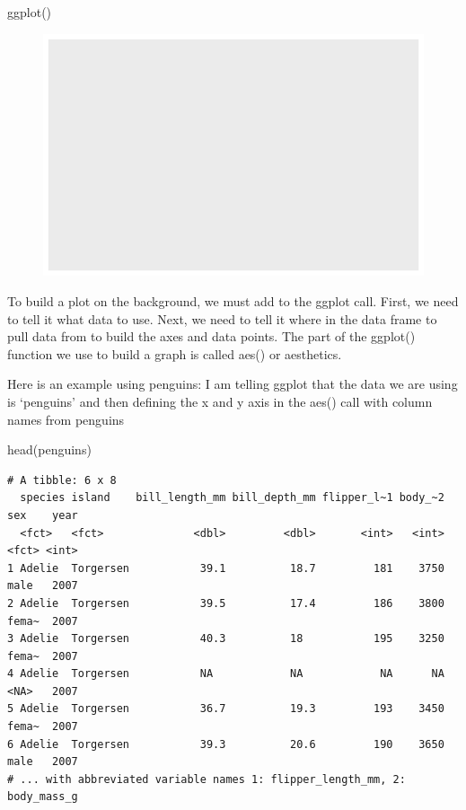 \documentclass[
  letterpaper,
  DIV=11,
  numbers=noendperiod]{scrartcl}
\newenvironment{Shaded}{\begin{snugshade}}{\end{snugshade}}
\newcommand{\FunctionTok}[1]{\textcolor[rgb]{0.28,0.35,0.67}{#1}}
\newcommand{\NormalTok}[1]{\textcolor[rgb]{0.00,0.23,0.31}{#1}}
\begin{document}
\begin{Shaded}
\begin{Highlighting}[]
\FunctionTok{ggplot}\NormalTok{()}
\end{Highlighting}
\end{Shaded}

\begin{figure}[H]

{\centering \includegraphics{basic_graphs_files/figure-pdf/unnamed-chunk-2-1.pdf}

}

\end{figure}

To build a plot on the background, we must add to the ggplot call.
First, we need to tell it what data to use. Next, we need to tell it
where in the data frame to pull data from to build the axes and data
points. The part of the ggplot() function we use to build a graph is
called aes() or aesthetics.

Here is an example using penguins: I am telling ggplot that the data we
are using is `penguins' and then defining the x and y axis in the aes()
call with column names from penguins

\begin{Shaded}
\begin{Highlighting}[]
\FunctionTok{head}\NormalTok{(penguins)}
\end{Highlighting}
\end{Shaded}

\begin{verbatim}
# A tibble: 6 x 8
  species island    bill_length_mm bill_depth_mm flipper_l~1 body_~2 sex    year
  <fct>   <fct>              <dbl>         <dbl>       <int>   <int> <fct> <int>
1 Adelie  Torgersen           39.1          18.7         181    3750 male   2007
2 Adelie  Torgersen           39.5          17.4         186    3800 fema~  2007
3 Adelie  Torgersen           40.3          18           195    3250 fema~  2007
4 Adelie  Torgersen           NA            NA            NA      NA <NA>   2007
5 Adelie  Torgersen           36.7          19.3         193    3450 fema~  2007
6 Adelie  Torgersen           39.3          20.6         190    3650 male   2007
# ... with abbreviated variable names 1: flipper_length_mm, 2: body_mass_g
\end{verbatim}
\end{document}
